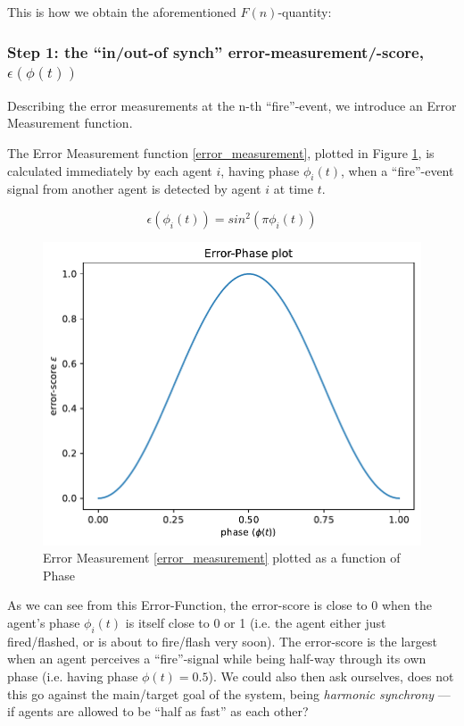 	This is how we obtain the aforementioned $F(n)$-quantity:
	
	
	\subsubsection{Step 1: the ``in/out-of synch'' error-measurement/-score, $\epsilon(\phi(t))$}
	
	Describing the error measurements at the n-th ``fire''-event, we introduce an Error Measurement function.
	
	The Error Measurement function \eqref{error_measurement}, plotted in Figure \ref{fig:error_measurement}, is calculated immediately by each agent $i$, having phase $\phi_i(t)$, when a ``fire''-event signal from another agent is detected by agent $i$ at time $t$.
	
	\begin{equation}
	\label{error_measurement}
		\epsilon(\phi_i(t)) = sin^2(\pi\phi_i(t))
	\end{equation} \nl
	
	\begin{figure}[ht!]
		\centering
		\includegraphics[width=0.8\linewidth]{Assets/Figures/PhaseErrorFunction.pdf}
		\caption{Error Measurement \eqref{error_measurement} plotted as a function of Phase}
		\label{fig:error_measurement}
	\end{figure}
	
	As we can see from this Error-Function, the error-score is close to 0 when the agent's phase $\phi_i(t)$ is itself close to 0 or 1 (i.e. the agent either just fired/flashed, or is about to fire/flash very soon). The error-score is the largest when an agent perceives a ``fire''-signal while being half-way through its own phase (i.e. having phase $\phi(t)=0.5$). We could also then ask ourselves, does not this go against the main/target goal of the system, being \textit{harmonic synchrony} — if agents are allowed to be ``half as fast'' as each other? 
	
